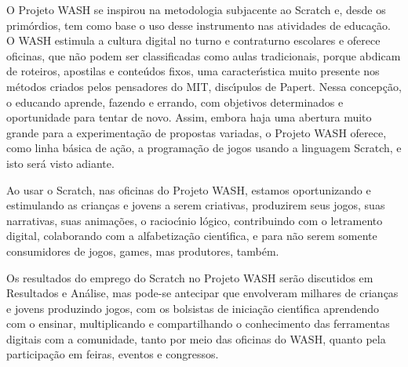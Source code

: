 \documentclass[
12pt,		%
openright,	%
twoside,  %
a4paper,			%
chapter=TITLE,		%
english,			%
french,				%
spanish,			%
brazil				%
]{USPSC-classe/USPSC}
\begin{document}
O Projeto WASH se inspirou na metodologia subjacente ao Scratch e, desde os prim\'ordios, tem como base o uso desse instrumento nas atividades de educa\c{c}\~ao. O WASH estimula a cultura digital no turno e contraturno escolares e oferece oficinas, que n\~ao podem ser classificadas como aulas tradicionais, porque abdicam de roteiros, apostilas e conte\'udos fixos, uma caracter\'{\i}stica muito presente nos m\'etodos criados pelos pensadores do MIT, disc\'{\i}pulos de Papert. Nessa concep\c{c}\~ao, o educando aprende, fazendo e errando, com objetivos determinados e oportunidade para tentar de novo. Assim, embora haja uma abertura muito grande para a experimenta\c{c}\~ao de propostas variadas, o Projeto WASH oferece, como linha b\'asica de a\c{c}\~ao, a programa\c{c}\~ao de jogos usando a linguagem Scratch, e isto ser\'a visto adiante.














Ao usar o Scratch, nas oficinas do Projeto WASH, estamos oportunizando e estimulando \textquotedbl as crian\c{c}as e jovens a serem criativas, produzirem seus jogos, suas narrativas, suas anima\c{c}\~oes, o racioc\'{\i}nio l\'ogico, contribuindo com o letramento digital, colaborando com a alfabetiza\c{c}\~ao cient\'{\i}fica, e para n\~ao serem somente consumidores de jogos, games, mas produtores, tamb\'em\textquotedbl .














Os resultados do emprego do Scratch no Projeto WASH ser\~ao discutidos em Resultados e An\'alise, mas pode-se antecipar que envolveram milhares de crian\c{c}as e jovens produzindo jogos, com os bolsistas de inicia\c{c}\~ao cient\'{\i}fica aprendendo com o ensinar, multiplicando e compartilhando o conhecimento das ferramentas digitais  com a comunidade, tanto por meio das oficinas do WASH, quanto pela participa\c{c}\~ao em feiras, eventos e congressos.
\end{document}
